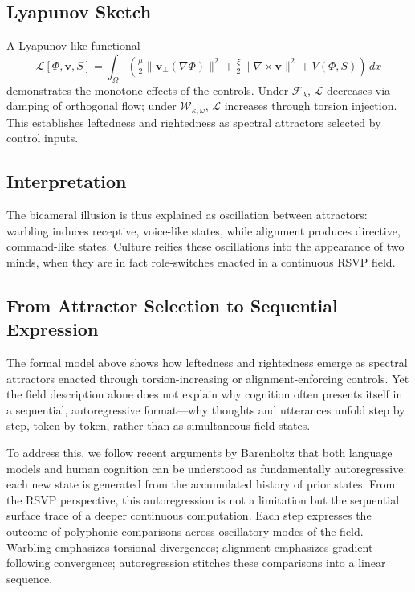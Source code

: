 \documentclass[a4paper,11pt]{article}
\begin{document}
\subsection{Lyapunov Sketch}
A Lyapunov-like functional
\begin{equation}
\mathcal{L}[\Phi,\mathbf{v},S] = 
\int_\Omega \left(
\tfrac{\mu}{2}\|\mathbf{v}_\perp(\nabla\Phi)\|^2 +
\tfrac{\xi}{2}\|\nabla\times \mathbf{v}\|^2 + V(\Phi,S)
\right)\,dx
\end{equation}
demonstrates the monotone effects of the controls. Under $\mathcal{F}_\lambda$, $\mathcal{L}$ decreases via damping of orthogonal flow; under $\mathcal{W}_{\kappa,\omega}$, $\mathcal{L}$ increases through torsion injection. This establishes leftedness and rightedness as spectral attractors selected by control inputs.

\subsection{Interpretation}
The bicameral illusion is thus explained as oscillation between attractors: warbling induces receptive, voice-like states, while alignment produces directive, command-like states. Culture reifies these oscillations into the appearance of two minds, when they are in fact role-switches enacted in a continuous RSVP field.

\subsection{From Attractor Selection to Sequential Expression}

The formal model above shows how leftedness and rightedness emerge as spectral attractors enacted through torsion-increasing or alignment-enforcing controls. Yet the field description alone does not explain why cognition often presents itself in a sequential, autoregressive format—why thoughts and utterances unfold step by step, token by token, rather than as simultaneous field states.

To address this, we follow recent arguments by Barenholtz \citep{Barenholtz2025} that both language models and human cognition can be understood as fundamentally autoregressive: each new state is generated from the accumulated history of prior states. From the RSVP perspective, this autoregression is not a limitation but the sequential surface trace of a deeper continuous computation. Each step expresses the outcome of polyphonic comparisons across oscillatory modes of the field. Warbling emphasizes torsional divergences; alignment emphasizes gradient-following convergence; autoregression stitches these comparisons into a linear sequence.
\end{document}
